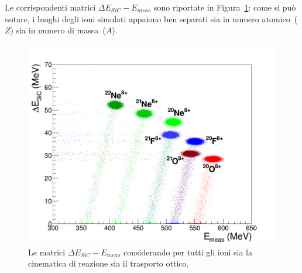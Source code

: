 





Le corrispondenti matrici $\Delta E_{SiC} - E_{meas}$ sono riportate in Figura~\ref{fig:deltaE_Emeas_PID}: come si può notare, i luoghi degli ioni simulati appaiono ben separati sia in numero atomico~($Z$) sia in numero di massa~($A$).
\begin{figure} [!p]
	\centering
	\includegraphics[width=\textwidth, keepaspectratio]{Grafici_Tesi2/PIDnew/deltaE_Emeas_quadrata_menoeventi.png}
	\caption{Le matrici $\Delta E_{SiC} - E_{meas}$ considerando per tutti gli ioni sia la cinematica di reazione sia il trasporto ottico.} \label{fig:deltaE_Emeas_PID}
\end{figure}
